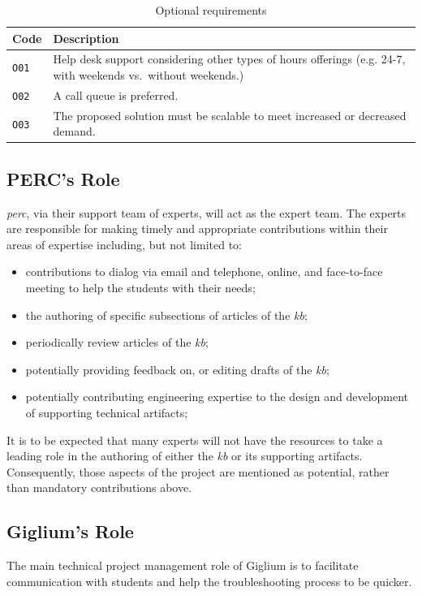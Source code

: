 \begin{table}[H]
	\centering
	\begin{tabular}{|l|l|} 
		\hline
		\textbf{Code} & \textbf{Description} \\
		\hline
		\texttt{O01} & \parbox{15 cm}{Help desk support considering other types of hours offerings (e.g. 24{-}7, with weekends vs.\ without weekends.)} \\
		\hline
		\texttt{O02} & \parbox{15 cm}{A call queue is preferred.} \\
		\hline
		\texttt{O03} & \parbox{15 cm}{The proposed solution must be scalable to meet increased or decreased demand.} \\
		\hline
	\end{tabular}
	\caption{Optional requirements}\label{tab:o_requirements}
\end{table}

\subsection{PERC's Role}
\textit{\gls{perc}}, via their support team of experts, will act as the expert team. The experts are responsible for making timely and appropriate contributions within their areas of expertise including, but not limited to:

\begin{itemize}
	\item contributions to dialog via email and telephone, online, and face-to-face meeting to help the students with their needs;
	\item the authoring of specific subsections of articles of the \textit{\gls{kb}};
	\item periodically review articles of the \textit{\gls{kb}};
	\item potentially providing feedback on, or editing drafts of the \textit{\gls{kb}};
	\item potentially contributing engineering expertise to the design and development of supporting technical artifacts;
\end{itemize}

It is to be expected that many experts will not have the resources to take a leading role
in the authoring of either the \textit{\gls{kb}} or its supporting artifacts.
Consequently, those aspects of the project are mentioned as potential, rather than mandatory
contributions above.

\subsection{Giglium's Role}
The main technical project management role of Giglium is to facilitate communication with students and help the troubleshooting process to be quicker.

